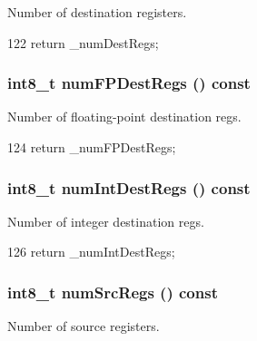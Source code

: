 Number of destination registers. 


\begin{DoxyCode}
122 { return _numDestRegs; }
\end{DoxyCode}
\hypertarget{classStaticInst_a7ec0ad00d322ae83bc5fae443ef04323}{
\subsubsection[{numFPDestRegs}]{\setlength{\rightskip}{0pt plus 5cm}int8\_\-t numFPDestRegs () const}}
\label{classStaticInst_a7ec0ad00d322ae83bc5fae443ef04323}


Number of floating-\/point destination regs. 


\begin{DoxyCode}
124 { return _numFPDestRegs; }
\end{DoxyCode}
\hypertarget{classStaticInst_a3935410f8201e0afd0f8e459f838b463}{
\subsubsection[{numIntDestRegs}]{\setlength{\rightskip}{0pt plus 5cm}int8\_\-t numIntDestRegs () const}}
\label{classStaticInst_a3935410f8201e0afd0f8e459f838b463}


Number of integer destination regs. 


\begin{DoxyCode}
126 { return _numIntDestRegs; }
\end{DoxyCode}
\hypertarget{classStaticInst_a3902ecc708a6f28e94ee9aa975692915}{
\subsubsection[{numSrcRegs}]{\setlength{\rightskip}{0pt plus 5cm}int8\_\-t numSrcRegs () const}}
\label{classStaticInst_a3902ecc708a6f28e94ee9aa975692915}


Number of source registers. 


